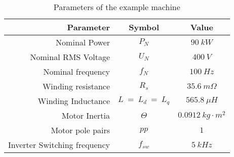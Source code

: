 \begin{table}[htb]
\caption{Parameters of the example machine}
\begin{center}
\begin{tabular}{|r|c|c|}
\hline
\textbf{Parameter} & \textbf{Symbol} & \textbf{Value} \\
\hline
Nominal Power & $P_N$ & $90\ kW$ \\
\hline
Nominal RMS Voltage & $U_N$ & $400\ V$ \\
\hline
Nominal frequency & $f_N$ & $100\ Hz$ \\
\hline
Winding resistance & $R_s$ & $35.6\ m\Omega$ \\
\hline
Winding Inductance & $L\ =\ L_d\ =\ L_q$& $565.8\  \mu{}H$ \\
\hline
Motor Inertia & $\Theta$ & $0.0912\  kg\cdot{}m^2$ \\
\hline
Motor pole pairs & $pp$ & $1$ \\
\hline
Inverter Switching frequency & $f_{sw}$ & $5\ kHz$ \\
\hline

\end{tabular}
\end{center}
\label{tab:machine}
\end{table}